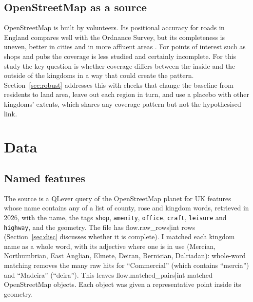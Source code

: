 \documentclass[11pt,a4paper]{article}
\begin{document}
\subsection{OpenStreetMap as a source}
OpenStreetMap is built by volunteers. Its positional accuracy for roads in England compares well with the Ordnance Survey, but its completeness is uneven, better in cities and in more affluent areas \citep{haklay2010}. For points of interest such as shops and pubs the coverage is less studied and certainly incomplete. For this study the key question is whether coverage differs between the inside and the outside of the kingdoms in a way that could create the pattern. Section~\ref{sec:robust} addresses this with checks that change the baseline from residents to land area, leave out each region in turn, and use a placebo with other kingdoms' extents, which shares any coverage pattern but not the hypothesised link.

\section{Data}\label{sec:data}
\subsection{Named features}
The source is a QLever query of the OpenStreetMap planet \citep{bast2017,bast2021} for UK features whose name contains any of a list of county, rose and kingdom words, retrieved in 2026, with the name, the tags \texttt{shop}, \texttt{amenity}, \texttt{office}, \texttt{craft}, \texttt{leisure} and \texttt{highway}, and the geometry. The file has {{flow.raw_rows|int}} rows (Section~\ref{sec:disc} discusses whether it is complete). I matched each kingdom name as a whole word, with its adjective where one is in use (Mercian, Northumbrian, East Anglian, Elmete, Deiran, Bernician, Dalriadan): whole-word matching removes the many raw hits for ``Commercial'' (which contains ``mercia'') and ``Madeira'' (``deira''). This leaves {{flow.matched_pairs|int}} matched OpenStreetMap objects. Each object was given a representative point inside its geometry.
\end{document}
